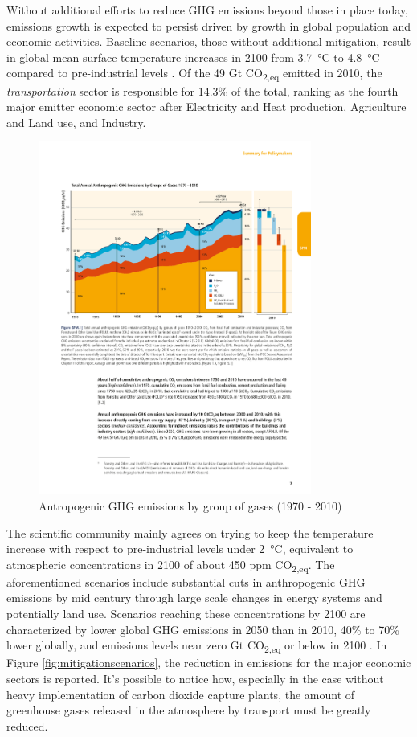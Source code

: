 Without additional efforts to reduce GHG emissions beyond those in place today, emissions growth is expected to persist driven by growth in global population and economic activities. Baseline scenarios, those without additional mitigation, result in global mean surface temperature increases in 2100 from \SI{3.7}{\celsius} to \SI{4.8}{\celsius} compared to pre-industrial levels \cite{IPCC2014}. Of the 49 Gt CO\textsubscript{2,eq} emitted in 2010, the \emph{transportation} sector is responsible for 14.3\% of the total, ranking as the fourth major emitter economic sector after Electricity and Heat production, Agriculture and Land use, and Industry.

\begin{figure}[h]
  \centering
\includegraphics[width=0.8\textwidth]{figures/introduction/antropogenic_ghg_emissions.pdf}
  \caption{Antropogenic GHG emissions by group of gases (1970 - 2010) \cite{IPCC2014}}
  \label{antropogenic_ghg_emissions}
\end{figure}

The scientific community mainly agrees on trying to keep the temperature increase with respect to pre-industrial levels under \SI{2}{\celsius}, equivalent to atmospheric concentrations in 2100 of about 450 ppm CO\textsubscript{2,eq}. The aforementioned scenarios include substantial cuts in anthropogenic GHG emissions by mid century through large scale changes in energy systems and potentially land use. Scenarios reaching these concentrations by 2100 are characterized by lower global GHG emissions in 2050 than in 2010, 40\% to 70\% lower globally, and emissions levels near zero Gt CO\textsubscript{2,eq} or below in 2100 \cite{IPCC2014}. In Figure \ref{fig:mitigationscenarios}, the reduction in emissions for the major economic sectors is reported. It's possible to notice how, especially in the case without heavy implementation of carbon dioxide capture plants, the amount of greenhouse gases released in the atmosphere by transport must be greatly reduced.

